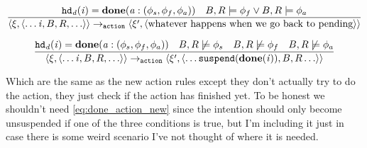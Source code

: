 \documentclass{blue-book}
\begin{document}
\begin{equation}
  \frac{
    \mathit{{\tt hd}_d}(\mathit{i}) = \mathbf{done}(\mathit{a}:(\phi_s,\phi_f,\phi_a))
\quad B, R \models \phi_f \lor B, R \models \phi_a
}{
\langle \xi, \langle \ldots \mathit{i}, B, R, \ldots \rangle \rangle \rightarrow_{\tt action} 
\langle \xi', \langle \text{whatever happens when we go back to pending} \rangle \rangle
}
\label{eq:done_action_fail}
\end{equation}

\begin{equation}
  \frac{
    \mathit{{\tt hd}_d}(\mathit{i}) = \mathbf{done}(\mathit{a}:(\phi_s,\phi_f,\phi_a))
\quad B, R \not \models \phi_s \quad B, R \not \models \phi_f \quad B, R \not \models \phi_a
}{
\langle \xi, \langle \ldots \mathit{i}, B, R, \ldots \rangle \rangle \rightarrow_{\tt action} 
\langle \xi', \langle \ldots {\tt suspend}(\mathbf{done}(\mathit{i})), B, R \ldots \rangle \rangle
}
\label{eq:done_action_new}
\end{equation}

Which are the same as the new action rules except they don't actually try to do the action,  they just check if the action has finished yet.  To be honest we shouldn't need \eqref{eq:done_action_new} since the intention should only become unsuspended if one of the three conditions is true, but I'm including it just in case there is some weird scenario I've not thought of where it is needed.



\end{document}
